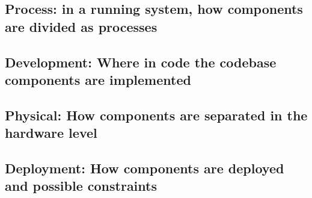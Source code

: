 \documentclass[11pt]{article}
\begin{document}
\subsection{Process: in a running system, how components are divided as processes}

\subsection{Development: Where in code the codebase components are implemented}
\subsection{Physical: How components are separated in the hardware level}

\subsection{Deployment: How components are deployed and possible constraints}
\end{document}
